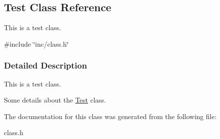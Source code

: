 \hypertarget{class_test}{}\subsection{Test Class Reference}
\label{class_test}


This is a test class.  




{\ttfamily \#include \char`\"{}inc/class.\+h\char`\"{}}



\subsubsection{Detailed Description}
This is a test class. 

Some details about the \mbox{\hyperlink{class_test}{Test}} class. 

The documentation for this class was generated from the following file\+:\begin{DoxyCompactItemize}
\item 
class.\+h\end{DoxyCompactItemize}

